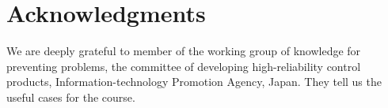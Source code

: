 \section{Acknowledgments}

We are deeply grateful to member of the working group of knowledge for preventing problems, the committee of developing high-reliability control products, Information-technology Promotion Agency, Japan. They tell us the useful cases for the course.

